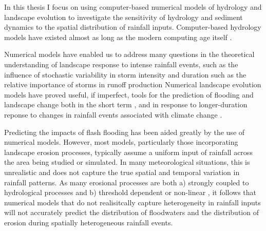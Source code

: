 In this thesis I focus on using computer-based numerical models of hydrology and landscape evolution to investigate the sensitivity of hydrology and sediment dynamics to the spatial distribution of rainfall inputs. Computer-based hydrology models have existed almost as long as the modern computing age itself \citep[e.g.][]{beven1979physically}.


Numerical models have enabled us to address many questions in the theoretical understanding of landscape response to intense rainfall events, such as the influence of stochastic variability in storm intensity and duration \citep{Tucker2000} such as the relative importance of storms in runoff production \citep{Darby2013}  Numerical landscape evolution models have proved useful, if imperfect, tools for the prediction of flooding and landscape change \citep{Tucker2010} both in the short term \citep{beven1984testing}, and in response to longer-duration reponse to changes in rainfall events associated with climate change \citep[e.g][]{coulthard2000modelling,Coulthard2012,hancock2017sediment}.

Predicting the impacts of flash flooding has been aided greatly by the use of numerical models. However, most models, particularly those incorporating landscape erosion processes, typically assume a uniform input of rainfall across the area being studied or simulated. In many meteorological situations, this is unrealistic and does not capture the true spatial and temporal variation in rainfall patterns. As many erosional processes are both a) strongly coupled to hydrological processes \citep{sidle2004hydrogeomorphology,loague2006physics,beven1989floods} and b) threshold dependent \citep{snyder2003importance} or non-linear \citep{coulthard1998non,phillips2003sources}, it follows that numerical models that do not realisitcally capture heterogeneity in rainfall inputs will not accurately predict the distribution of floodwaters and the distribution of erosion during spatially heterogeneous rainfall events.



